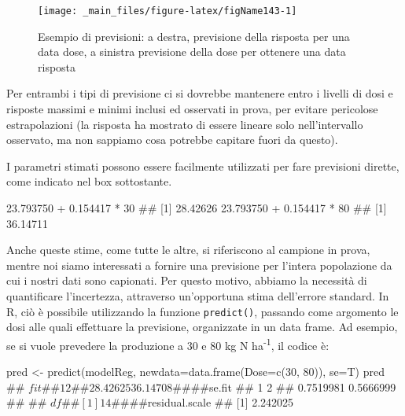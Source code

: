 \documentclass[a4paper,12pt,oneside]{book}
\newenvironment{Shaded}{\begin{snugshade}}{\end{snugshade}}
\newcommand{\DecValTok}[1]{#1}
\newcommand{\FloatTok}[1]{#1}
\newcommand{\SpecialCharTok}[1]{#1}
\newcommand{\DocumentationTok}[1]{#1}
\newcommand{\OtherTok}[1]{#1}
\newcommand{\FunctionTok}[1]{#1}
\newcommand{\AttributeTok}[1]{#1}
\newcommand{\NormalTok}[1]{#1}
\begin{document}
\begin{figure}

{\centering \texttt{[image: \_main\_files/figure-latex/figName143-1]} 

}

\caption{Esempio di previsioni: a destra, previsione della risposta per una data dose, a sinistra previsione della dose per ottenere una data risposta}\label{fig:figName143}
\end{figure}

Per entrambi i tipi di previsione ci si dovrebbe mantenere entro i livelli di dosi e risposte massimi e minimi inclusi ed osservati in prova, per evitare pericolose estrapolazioni (la risposta ha mostrato di essere lineare solo nell'intervallo osservato, ma non sappiamo cosa potrebbe capitare fuori da questo).

I parametri stimati possono essere facilmente utilizzati per fare previsioni dirette, come indicato nel box sottostante.

\begin{Shaded}
\begin{Highlighting}[]
\FloatTok{23.793750} \SpecialCharTok{+} \FloatTok{0.154417} \SpecialCharTok{*} \DecValTok{30}
\DocumentationTok{\#\# [1] 28.42626}
\FloatTok{23.793750} \SpecialCharTok{+} \FloatTok{0.154417} \SpecialCharTok{*} \DecValTok{80}
\DocumentationTok{\#\# [1] 36.14711}
\end{Highlighting}
\end{Shaded}

Anche queste stime, come tutte le altre, si riferiscono al campione in prova, mentre noi siamo interessati a fornire una previsione per l'intera popolazione da cui i nostri dati sono capionati. Per questo motivo, abbiamo la necessità di quantificare l'incertezza, attraverso un'opportuna stima dell'errore standard. In R, ciò è possibile utilizzando la funzione \texttt{predict()}, passando come argomento le dosi alle quali effettuare la previsione, organizzate in un data frame. Ad esempio, se si vuole prevedere la produzione a 30 e 80 kg N ha\textsuperscript{-1}, il codice è:

\begin{Shaded}
\begin{Highlighting}[]
\NormalTok{pred }\OtherTok{\textless{}{-}} \FunctionTok{predict}\NormalTok{(modelReg, }\AttributeTok{newdata=}\FunctionTok{data.frame}\NormalTok{(}\AttributeTok{Dose=}\FunctionTok{c}\NormalTok{(}\DecValTok{30}\NormalTok{, }\DecValTok{80}\NormalTok{)), }\AttributeTok{se=}\NormalTok{T)}
\NormalTok{pred}
\DocumentationTok{\#\# $fit}
\DocumentationTok{\#\#        1        2 }
\DocumentationTok{\#\# 28.42625 36.14708 }
\DocumentationTok{\#\# }
\DocumentationTok{\#\# $se.fit}
\DocumentationTok{\#\#         1         2 }
\DocumentationTok{\#\# 0.7519981 0.5666999 }
\DocumentationTok{\#\# }
\DocumentationTok{\#\# $df}
\DocumentationTok{\#\# [1] 14}
\DocumentationTok{\#\# }
\DocumentationTok{\#\# $residual.scale}
\DocumentationTok{\#\# [1] 2.242025}
\end{Highlighting}
\end{Shaded}
\end{document}
